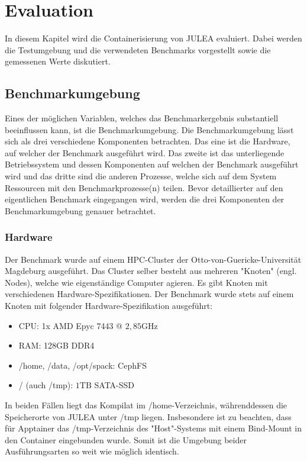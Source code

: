 \chapter{Evaluation} \label{cha:evaluation}

In diesem Kapitel wird die Containerisierung von JULEA evaluiert. Dabei werden die Testumgebung und die verwendeten Benchmarks vorgestellt sowie die gemessenen Werte diskutiert.

\section{Benchmarkumgebung}

Eines der möglichen Variablen, welches das Benchmarkergebnis substantiell beeinflussen kann, ist die Benchmarkumgebung. Die Benchmarkumgebung lässt sich als drei verschiedene Komponenten betrachten. Das eine ist die Hardware, auf welcher der Benchmark ausgeführt wird. Das zweite ist das unterliegende Betriebssystem und dessen Komponenten auf welchen der Benchmark ausgeführt wird und das dritte sind die anderen Prozesse, welche sich auf dem System Ressourcen mit den Benchmarkprozesse(n) teilen. Bevor detaillierter auf den eigentlichen Benchmark eingegangen wird, werden die drei Komponenten der Benchmarkumgebung genauer betrachtet.

\subsection{Hardware}

Der Benchmark wurde auf einem HPC-Cluster der Otto-von-Guericke-Universität Magdeburg ausgeführt. Das Cluster selber besteht aus mehreren "Knoten" (engl. Nodes), welche wie eigenständige Computer agieren. Es gibt Knoten mit verschiedenen Hardware-Spezifikationen. Der Benchmark wurde stets auf einem Knoten mit folgender Hardware-Spezifikation ausgeführt:

\begin{itemize}
    \item CPU: 1x AMD Epyc 7443 @ $2,85\text{GHz}$
    \item RAM: 128GB DDR4
    \item /home, /data, /opt/spack: CephFS
    \item /\*\* (auch /tmp): $1\text{TB}$ SATA-SSD  
\end{itemize}

In beiden Fällen liegt das Kompilat im /home-Verzeichnis, währenddessen die Speicherorte von JULEA unter /tmp liegen. Insbesondere ist zu beachten, dass für Apptainer das /tmp-Verzeichnis des "Host"-Systems mit einem Bind-Mount in den Container eingebunden wurde. Somit ist die Umgebung beider Ausführungsarten so weit wie möglich identisch.


